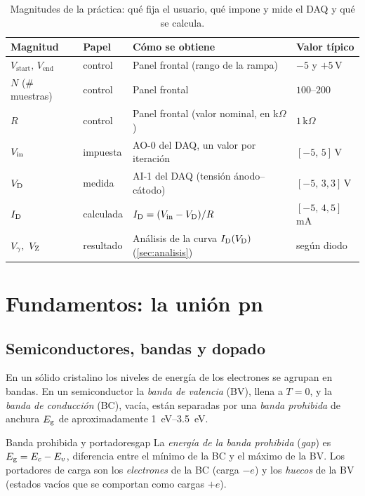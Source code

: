 \documentclass[11pt,a4paper]{article}
\begin{document}
\begin{table}[htbp]
  \centering\small
  \caption{Magnitudes de la práctica: qué fija el usuario, qué impone y mide
  el DAQ y qué se calcula.}
  \label{tab:magnitudes}
  \renewcommand{\arraystretch}{1.25}
  \begin{tabularx}{\linewidth}{@{}l l X l@{}}
    \toprule
    \textbf{Magnitud} & \textbf{Papel} & \textbf{Cómo se obtiene} & \textbf{Valor típico}\\
    \midrule
    $V_{\text{start}},\,V_{\text{end}}$ & control & Panel frontal (rango de la rampa) & $-5$ y $+5$\,V\\
    $N$ (\# muestras) & control & Panel frontal & $100$--$200$\\
    $R$ & control & Panel frontal (valor nominal, en k$\Omega$) & $1$\,k$\Omega$\\
    \rowcolor{azulpalido}
    $V_{\mathrm{in}}$ & impuesta & AO-0 del DAQ, un valor por iteración & $[-5,\,5]$\,V\\
    \rowcolor{azulpalido}
    $V_{\mathrm D}$ & medida & AI-1 del DAQ (tensión ánodo--cátodo) & $[-5,\,3{,}3]$\,V\\
    $I_{\mathrm D}$ & calculada & $I_{\mathrm D}=(V_{\mathrm{in}}-V_{\mathrm D})/R$ & $[-5,\,4{,}5]$\,mA\\
    $\Vg,\ \VZ$ & resultado & Análisis de la curva $I_{\mathrm D}(V_{\mathrm D})$ (\cref{sec:analisis}) & según diodo\\
    \bottomrule
  \end{tabularx}
\end{table}

\section{Fundamentos: la unión pn}
\label{sec:fundamentos}

\subsection{Semiconductores, bandas y dopado}

En un sólido cristalino los niveles de energía de los electrones se agrupan
en bandas. En un semiconductor la \emph{banda de valencia} (BV), llena a
$T=0$, y la \emph{banda de conducción} (BC), vacía, están separadas por una
\emph{banda prohibida} de anchura $E_{\mathrm g}$ de aproximadamente \SIrange{1}{3.5}{eV}.

\begin{definicion}{Banda prohibida y portadores}{gap}
  La \emph{energía de la banda prohibida} (\emph{gap}) es
  $E_{\mathrm g}=E_c-E_v$, diferencia entre el mínimo de la BC y el máximo de la BV.
  Los portadores de carga son los \emph{electrones} de la BC (carga $-e$) y
  los \emph{huecos} de la BV (estados vacíos que se comportan como cargas
  $+e$).
\end{definicion}
\end{document}
